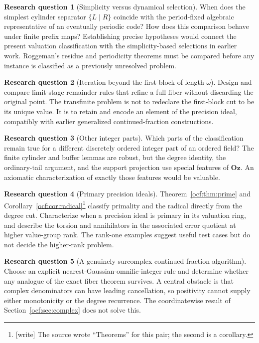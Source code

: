 \documentclass[11pt,a4paper]{article}
\numberwithin{equation}{section}
\theoremstyle{definition}
\newtheorem{problem}{Research question}
\theoremstyle{remark}
\newcommand{\Oz}{\mathbf{Oz}}
\newcommand{\wtag}{\textup{[write]}}%
\begin{document}
\begin{problem}[Simplicity versus dynamical selection]\label{ocf:q:simplicity}
When does the simplest cylinder separator $\{L\mid R\}$ coincide with the
period-fixed algebraic representative of an eventually periodic code?
How does this comparison behave under finite prefix maps? Establishing
precise hypotheses would connect the present valuation classification
with the simplicity-based selections in earlier work. Roggeman's residue
and periodicity theorems must be compared before any instance is
classified as a previously unresolved problem.
\end{problem}

\begin{problem}[Iteration beyond the first block of length $\omega$]\label{ocf:q:transfinite}
Design and compare limit-stage remainder rules that refine a full fiber
without discarding the original point. The transfinite problem is not to
redeclare the first-block cut to be its unique value. It is to retain and
encode an element of the precision ideal, compatibly with earlier
generalized continued-fraction constructions.
\end{problem}

\begin{problem}[Other integer parts]\label{ocf:q:integerparts}
Which parts of the classification remain true for a different discretely
ordered integer part of an ordered field? The finite cylinder and buffer
lemmas are robust, but the degree identity, the ordinary-tail argument,
and the support projection use special features of $\Oz$. An axiomatic
characterization of exactly those features would be valuable.
\end{problem}

\begin{problem}[Primary precision ideals]\label{ocf:q:primary}
Theorem~\ref{ocf:thm:prime} and Corollary~\ref{ocf:cor:radical}\footnote{\wtag{}
The source wrote ``Theorems'' for this pair; the second is a corollary.}
classify primality and the
radical directly from the degree cut. Characterize when a precision ideal
is primary in its valuation ring, and describe the torsion and
annihilators in the associated error quotient at higher value-group rank.
The rank-one examples suggest useful test cases but do not decide the
higher-rank problem.
\end{problem}

\begin{problem}[A genuinely surcomplex continued-fraction algorithm]\label{ocf:q:surcomplex}
Choose an explicit nearest-Gaussian-omnific-integer rule and determine
whether any analogue of the exact fiber theorem survives. A central
obstacle is that complex denominators can have leading cancellation, so
positivity cannot supply either monotonicity or the degree recurrence.
The coordinatewise result of Section~\ref{ocf:sec:complex} does not solve this.
\end{problem}
\end{document}
